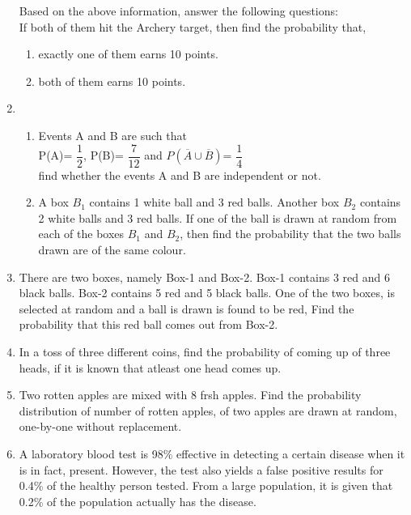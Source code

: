 \documentclass[a4paper,12pt]{article}
\begin{document}
\begin{enumerate}
Based on the above information, answer the following questions: \\
If both of them hit the Archery target, then find the probability that,\
\begin{enumerate}
\item exactly one of them earns 10 points. 

\item both of them earns 10 points.

\end{enumerate}

\item \begin{enumerate}
\item Events A and B are such that\\
P(A)= $\dfrac{1}{2}$, P(B)= $\dfrac{7}{12}$ and $P(\overline A \cup \overline B)$= $\dfrac{1}{4}$ \\
find whether the events A and B are independent  or not. 

\item A box $B_1$ contains 1 white ball and 3 red balls. Another box  $B_2$ contains 2 white balls and 3 red balls. If one of the ball is drawn at random from each of the boxes  $B_1$ and  $B_2$, then find the probability that the two balls drawn are of the same colour.
\end{enumerate}

\item There are two boxes, namely Box-1 and Box-2. Box-1 contains 3 red and 6 black balls. Box-2 contains 5 red and 5 black balls. One of the two boxes, is selected at random and a ball is drawn is found to be red, Find the probability that this red ball comes out from Box-2.

\item In a toss of  three different coins, find the probability of coming up of three heads, if it is known that atleast one  head comes up.

\item Two rotten apples are mixed with 8 frsh apples. Find the probability distribution of number of rotten apples, of two apples are drawn at random, one-by-one without replacement.

\item A laboratory blood test is 98\% effective in detecting a certain disease when it is in fact, present. However, the test also yields a false positive results for 0.4\% of the healthy person tested. From a large population, it is given that 0.2\% of the population actually has the disease.\


\end{enumerate}
\end{document}
